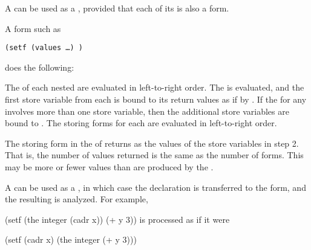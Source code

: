 \endlist
\endlist
 

\endsubsubsection%



A   can be used as a ,
provided that each of its  is also a  form.

A form such as

{\tt (setf (values  \dots {}) )}

does the following:

\beginlist
{} The  of each nested  are evaluated
in left-to-right order.
 The  is evaluated, and the first store
variable from each  is bound to its return values as if by 
.  
 If the  for any  
involves more than one store variable, then the additional
store variables are bound to \nil.
 The storing forms for each  are evaluated in
left-to-right order.
\endlist

The storing form in the  of 
returns as  the values of the store
variables in step 2.  That is, the number of values returned is the
same as the number of  forms.  This may be more or fewer
values than are produced by the .


\endsubsubsection%



A   can be used as a ,
in which case the declaration is transferred to the  form,
and the resulting  is analyzed.  For example,

\code
 (setf (the integer (cadr x)) (+ y 3))
\endcode
is processed as if it were

\code
 (setf (cadr x) (the integer (+ y 3)))
\endcode

